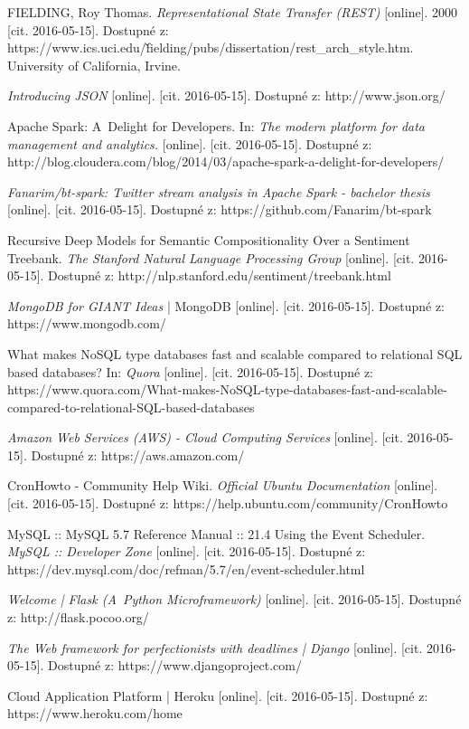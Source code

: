 \documentclass[thesis=B,czech]{FITthesis}[2012/06/26]
\begin{document}
\begin{thebibliography}{1}
FIELDING, Roy Thomas. \textit{Representational State Transfer (REST)} [online]. 2000 [cit. 2016-05-15]. Dostupné z: https://www.ics.uci.edu/\~fielding/pubs/dissertation/rest\_arch\_style.htm. University of California, Irvine.

\textit{Introducing JSON} [online]. [cit. 2016-05-15]. Dostupné z: http://www.json.org/

Apache Spark: A~Delight for Developers. In: \textit{The modern platform for data management and analytics.} [online]. [cit. 2016-05-15]. Dostupné z: http://blog.cloudera.com/blog/2014/03/apache-spark-a-delight-for-developers/

\textit{Fanarim/bt-spark: Twitter stream analysis in Apache Spark - bachelor thesis} [online]. [cit. 2016-05-15]. Dostupné z: https://github.com/Fanarim/bt-spark

Recursive Deep Models for Semantic Compositionality Over a Sentiment Treebank. \textit{The Stanford Natural Language Processing Group }[online]. [cit. 2016-05-15]. Dostupné z: http://nlp.stanford.edu/sentiment/treebank.html

\textit{MongoDB for GIANT Ideas} | MongoDB [online]. [cit. 2016-05-15]. Dostupné z: https://www.mongodb.com/

What makes NoSQL type databases fast and scalable compared to relational SQL based databases? In: \textit{Quora} [online]. [cit. 2016-05-15]. Dostupné z: https://www.quora.com/What-makes-NoSQL-type-databases-fast-and-scalable-compared-to-relational-SQL-based-databases

\textit{Amazon Web Services (AWS) - Cloud Computing Services} [online]. [cit. 2016-05-15]. Dostupné z: https://aws.amazon.com/

CronHowto - Community Help Wiki. \textit{Official Ubuntu Documentation }[online]. [cit. 2016-05-15]. Dostupné z: https://help.ubuntu.com/community/CronHowto

MySQL :: MySQL 5.7 Reference Manual :: 21.4 Using the Event Scheduler. \textit{MySQL :: Developer Zone} [online]. [cit. 2016-05-15]. Dostupné z: https://dev.mysql.com/doc/refman/5.7/en/event-scheduler.html

\textit{Welcome | Flask (A~Python Microframework)} [online]. [cit. 2016-05-15]. Dostupné z: http://flask.pocoo.org/

\textit{The Web framework for perfectionists with deadlines | Django} [online]. [cit. 2016-05-15]. Dostupné z: https://www.djangoproject.com/

Cloud Application Platform | Heroku [online]. [cit. 2016-05-15]. Dostupné z: https://www.heroku.com/home
  
  
\end{thebibliography}
\end{document}
